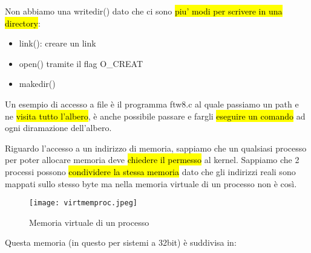 Non abbiamo una writedir() dato che ci sono \hl{piu' modi per scrivere in una directory}:

\begin{itemize}
	\item link(): creare un link
	\item open() tramite il flag O\_CREAT
	\item makedir()
\end{itemize}


Un esempio di accesso a file è il programma ftw8.c al quale passiamo un path e ne \hl{visita tutto l'albero}, è anche possibile passare e fargli \hl{eseguire un comando} ad ogni diramazione dell'albero.

Riguardo l'accesso a un indirizzo di memoria, sappiamo che un qualsiasi processo per poter allocare memoria deve \hl{chiedere il permesso} al kernel. Sappiamo che 2 processi possono \hl{condividere la stessa memoria} dato che gli indirizzi reali sono mappati sullo stesso byte ma nella memoria virtuale di un processo non è così.


\begin{figure}[H]
\centering
\texttt{[image: virtmemproc.jpeg]}
\caption{Memoria virtuale di un processo} 
\label{virtmemproc}
\end{figure}


Questa memoria (in questo per sistemi a 32bit) è suddivisa in:

